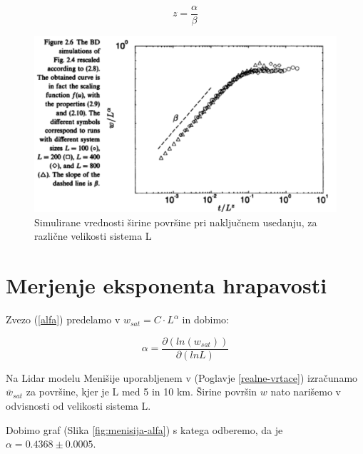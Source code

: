 \documentclass[a4paper, oneside, 12pt]{book}
\begin{document}
            \begin{equation}
              z = \frac{\alpha}{\beta}
            \end{equation}

            \begin{figure}[H]
              \begin{center}
                \includegraphics[width=13cm]{slike/barabasi}
              \end{center}
              \caption{Simulirane vrednosti širine površine pri naključnem usedanju, za različne velikosti sistema L \cite{barabasi1995fractal}}
              \label{fig:barabasi}
            \end{figure}



            \section{Merjenje eksponenta hrapavosti}
            \label{hrapavost}

            Zvezo (\ref{alfa}) predelamo  v $ w_{sat}=C \cdot L^\alpha $ in dobimo:

            \begin{equation}
              \alpha = \frac{\partial ( ln (w_{sat}) ) }{\partial ( ln L )}
              \label{alpha-numeric}
            \end{equation}

            Na Lidar modelu Menišije uporabljenem v (Poglavje \ref{realne-vrtace}) izračunamo $\bar{w}_{sat}$ za površine, kjer je L med 5 in 10 km. Širine površin $w$ nato narišemo v odvisnosti od velikosti sistema L.

            Dobimo graf (Slika \ref{fig:menisija-alfa}) s katega odberemo, da je $\alpha =  0.4368 \pm 0.0005$.
\end{document}
